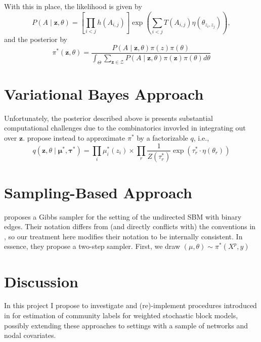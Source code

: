 \documentclass[12pt]{article}   %
\newcommand{\V}[1]{\ensuremath{\boldsymbol{#1}}}
\newcommand{\M}[1]{\ensuremath{#1}}
\begin{document}
With this in place, the likelihood is given by
\begin{equation*}
  P(A \mid \V{z}, \theta) = \left[ \prod_{i < j}  h(A_{i,j}) \right] \exp( \sum_{i < j} T(A_{i,j}) \eta(\theta_{z_i,z_j}) ),
\end{equation*}
and the posterior by
\begin{equation*}
  \pi^{*}(\V{z},\M{\theta}) = \frac{P(\M{A} \mid \V{z},\M{\theta}) \pi(z) \pi(\theta)}{\int_{\Theta} \sum_{\V{z} \in \mathcal{Z}} P(\M{A} \mid \V{z}, \M{\theta}) \pi(\V{z}) \pi(\M{\theta}) d \theta}
\end{equation*}



\section{Variational Bayes Approach}
\label{sec:vari-bayes-appr}
Unfortunately, the posterior described above is presents substantial computational challenges due to the combinatorics invovled in integrating out over $\V{z}$.
\textcite*{aicher_adapting_2013,aicher_learning_2015} propose instead to approximate $\pi^{*}$ by a factorizable $q$, i.e.,
\begin{equation*}
  q(\V{z}, \theta \mid \V{\mu^{*}}, \V{\tau^{*}}) = \prod_i \mu_i^{*}(z_i) \times \prod_r \frac{1}{Z(\tau_r^{*})} \exp( \tau_r^{*} \cdot \eta(\theta_r))
\end{equation*}


\section{Sampling-Based Approach}
\label{sec:sampl-based-appr}

\Textcite{snijders_estimation_1997} proposes a Gibbs sampler for the setting of the undirected SBM with binary edges.
Their notation differs from (and directly conflicts with) the conventions in \parencite{aicher_adapting_2013,aicher_learning_2015}, so our treatment here modifies their notation to be internally consistent.
In essence, they propose a two-step sampler.
First, we draw $(\mu, \theta) \sim \pi^{*}(X^p, y)$

\section{Discussion}
\label{sec:discussion}






In this project I propose to investigate and (re)-implement procedures introduced in \cite{aicher_adapting_2013,aicher_learning_2015} for estimation of community labels for weighted stochastic block models, possibly extending these approaches to settings with a sample of networks and nodal covariates.
\end{document}
